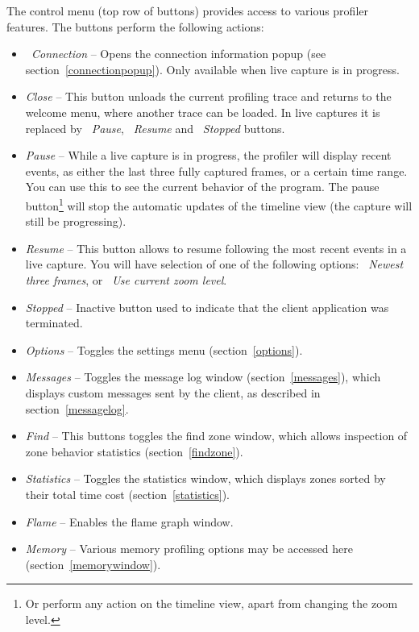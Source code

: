 \documentclass[hidelinks,titlepage,a4paper,twoside]{article}
\begin{document}
The control menu (top row of buttons) provides access to various profiler features. The buttons perform the following actions:

\begin{itemize}
\item \emph{\faWifi{}~Connection} -- Opens the connection information popup (see section~\ref{connectionpopup}). Only available when live capture is in progress.
\item \emph{\faPowerOff{} Close} -- This button unloads the current profiling trace and returns to the welcome menu, where another trace can be loaded. In live captures it is replaced by \emph{\faPause{}~Pause}, \emph{\faPlay{}~Resume} and \emph{\faSquare{}~Stopped} buttons.
\item \emph{\faPause{} Pause} -- While a live capture is in progress, the profiler will display recent events, as either the last three fully captured frames, or a certain time range. You can use this to see the current behavior of the program. The pause button\footnote{Or perform any action on the timeline view, apart from changing the zoom level.} will stop the automatic updates of the timeline view (the capture will still be progressing).
\item \emph{\faPlay{} Resume} -- This button allows to resume following the most recent events in a live capture. You will have selection of one of the following options: \emph{\faSearchPlus{}~Newest three frames}, or \emph{\faRulerHorizontal{}~Use current zoom level}.
\item \emph{\faSquare{} Stopped} -- Inactive button used to indicate that the client application was terminated.
\item \emph{\faCog{} Options} -- Toggles the settings menu (section~\ref{options}).
\item \emph{\faTags{} Messages} -- Toggles the message log window (section~\ref{messages}), which displays custom messages sent by the client, as described in section~\ref{messagelog}.
\item \emph{\faSearch{} Find} -- This buttons toggles the find zone window, which allows inspection of zone behavior statistics (section~\ref{findzone}).
\item \emph{\faSortAmountUp{} Statistics} -- Toggles the statistics window, which displays zones sorted by their total time cost (section~\ref{statistics}).
\item \emph{\faFire{} Flame} -- Enables the flame graph window.
\item \emph{\faMemory{} Memory} -- Various memory profiling options may be accessed here (section~\ref{memorywindow}).

\end{itemize}
\end{document}
